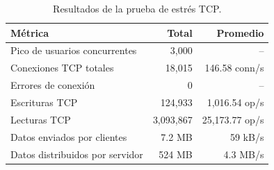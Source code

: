 \begin{table}[htbp]
    \centering
    \small
    \begin{tabular}{lrr}
        \hline
        \textbf{Métrica} & \textbf{Total} & \textbf{Promedio} \\ \hline
        Pico de usuarios concurrentes & 3,000 & -- \\
        Conexiones TCP totales & 18,015 & 146.58 conn/s \\
        Errores de conexión & 0 & -- \\
        Escrituras TCP & 124,933 & 1,016.54 op/s \\
        Lecturas TCP & 3,093,867 & 25,173.77 op/s \\
        Datos enviados por clientes & 7.2 MB & 59 kB/s \\
        Datos distribuidos por servidor & 524 MB & 4.3 MB/s \\
        \hline
    \end{tabular}
    \caption{Resultados de la prueba de estrés TCP.}
    \label{tab:estres}
\end{table}